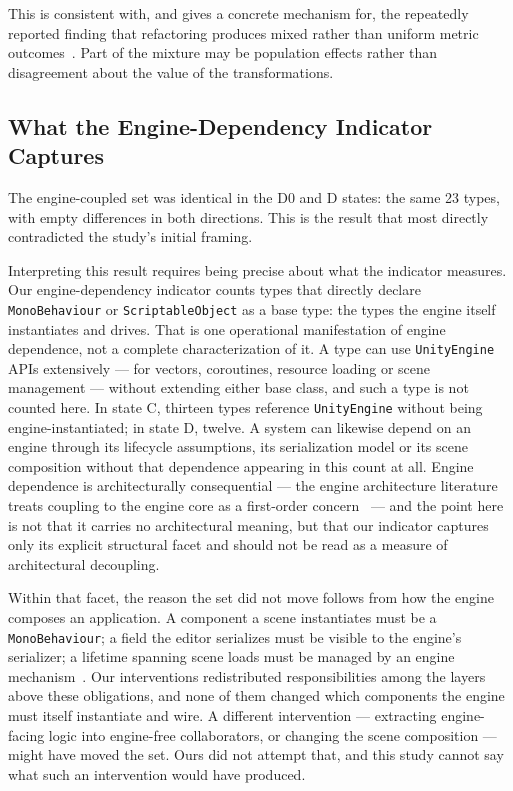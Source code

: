 \documentclass{sbc2019}%
\begin{document}
This is consistent with, and gives a concrete mechanism for, the repeatedly
reported finding that refactoring produces mixed rather than uniform metric
outcomes~\cite{szoke2017,bavota2015,palomba2018}. Part of the mixture may be
population effects rather than disagreement about the value of the
transformations.

\subsection{What the Engine-Dependency Indicator Captures}

The engine-coupled set was identical in the D0 and D states: the same 23 types, with empty
differences in both directions. This is the result that most directly
contradicted the study's initial framing.

Interpreting this result requires being precise about what the indicator
measures. Our engine-dependency indicator counts types that directly declare
\texttt{MonoBehaviour} or \texttt{ScriptableObject} as a base type: the types
the engine itself instantiates and drives. That is one operational manifestation
of engine dependence, not a complete characterization of it. A type can use
\texttt{UnityEngine} APIs extensively --- for vectors, coroutines, resource
loading or scene management --- without extending either base class, and such a
type is not counted here. In state C, thirteen types reference
\texttt{UnityEngine} without being engine-instantiated; in state D, twelve. A
system can likewise depend on an engine through its lifecycle assumptions, its
serialization model or its scene composition without that dependence appearing
in this count at all. Engine dependence is
architecturally consequential --- the engine architecture literature treats
coupling to the engine core as a first-order concern~\cite{politowski2025,ullmann2023} --- and the point here is not that it carries
no architectural meaning, but that our indicator captures only its explicit
structural facet and should not be read as a measure of architectural decoupling.

Within that facet, the reason the set did not move follows from how the engine
composes an application. A component a scene instantiates must be a
\texttt{MonoBehaviour}; a field the editor serializes must be visible to the
engine's serializer; a lifetime spanning scene loads must be managed by an engine
mechanism~\cite{unitydocs}. Our interventions redistributed responsibilities
among the layers above these obligations, and none of them changed which
components the engine must itself instantiate and wire. A different intervention
--- extracting engine-facing logic into engine-free collaborators, or changing the
scene composition --- might have moved the set. Ours did not attempt that, and
this study cannot say what such an intervention would have produced.
\end{document}
